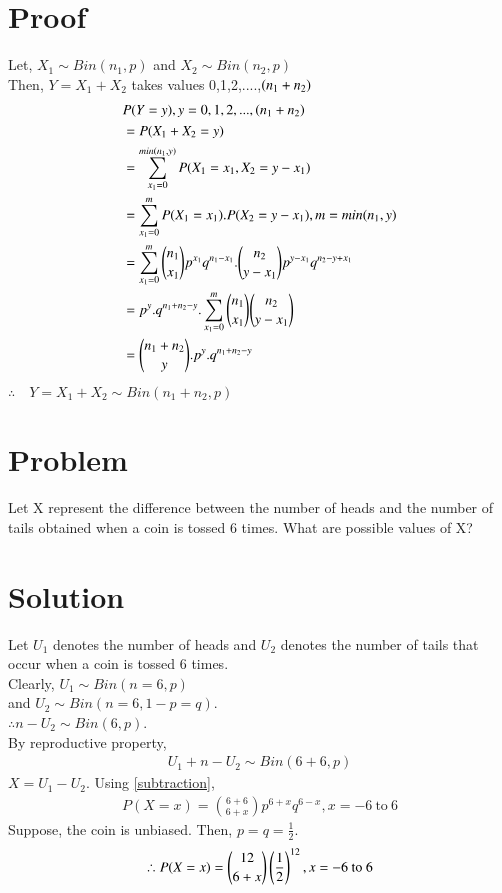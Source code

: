 \documentclass[journal,12pt,twocolumn]{IEEEtran}
\begin{document}
\section{Proof}
Let, $X_1 \sim  Bin(n_1, p)$ and $X_2 \sim Bin(n_2, p)$\\
Then, $Y= X_1 + X_2$ takes values 0,1,2,....,$\left(n_1+n_2\right) $
\begin{align}
    &P(Y=y) , y=0,1,2,...,\left(n_1+n_2\right)\\
    &= P(X_1+X_2 = y)\\
    &= \sum_{x_1=0}^{min\left(n_1,y\right)} P(X_1=x_1, X_2= y-x_1)\\
    &= \sum_{x_1=0}^m P(X_1=x_1). P(X_2= y-x_1), m=min(n_1,y)\\
    &= \sum_{x_1=0}^m \binom{n_1}{x_1}p^{x_1} q^{n_1 - x_1}. \binom{n_2}{y-x_1} p^{y-x_1} q^{n_2-y+x_1}\\
    &= p^y.q^{n_1+n_2-y}. \sum_{x_1=0}^m \binom{n_1}{x_1} \binom{n_2}{y-x_1}\\
    &= \binom{n_1+n_2}{y}. p^y.q^{n_1+n_2-y}
\end{align}
$\therefore \quad Y= X_1+X_2 \sim Bin(n_1+n_2, p)$
\section{Problem}
Let X represent the difference between the
number of heads and the number of tails
obtained when a coin is tossed 6 times. What
are possible values of X?
\section{Solution}
Let $U_1$ denotes the number of heads and $U_2$ denotes the number of tails that occur when a coin is tossed 6 times.\\
Clearly, $U_1 \sim Bin(n=6, p)$\\
and $U_2 \sim Bin(n=6,1-p=q)$.\\
$\therefore n-U_2 \sim Bin(6, p)$.\\
By reproductive property,
\begin{align}
    U_1+n-U_2 \sim Bin(6+6, p)
\end{align}
$X=U_1-U_2$. Using \eqref{subtraction},
\begin{align}
    P(X=x) = \binom{6+6}{6+x} p^{6+x} q^{6-x}, x= -6\ \text{to}\ 6 
\end{align}
Suppose, the coin is unbiased. Then, $p=q= \frac{1}{2}$.
\begin{align}
    \therefore P(X=x) = \binom{12}{6+x}\brak{\frac{1}{2}}^{12}, x= -6\ \text{to}\ 6 
\end{align}
\end{document}
